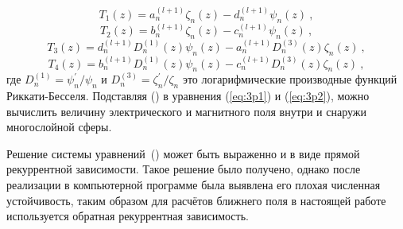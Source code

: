 \begin{equation*}
  T_1(z) =   a^{(l+1)}_{n}  \zeta_{n}(z) 
           - d^{(l+1)}_{n}  \psi_{n}(z)\:,
\end{equation*}
\begin{equation*}
  T_2(z) =   b^{(l+1)}_{n}  \zeta_{n}(z) 
           - c^{(l+1)}_{n}  \psi_{n}(z)\:,
\end{equation*}
\begin{equation*}
  T_3(z) =  d^{(l+1)}_{n}  D^{(1)}_{n}(z)  \psi_{n}(z) 
          - a^{(l+1)}_{n}  D^{(3)}_{n}(z)  \zeta_{n} (z)\:,
\end{equation*}
\begin{equation*}
  T_4(z) =  b^{(l+1)}_{n}  D^{(1)}_{n}(z)  \psi_{n}(z) 
          - c^{(l+1)}_{n}  D^{(3)}_{n}(z)  \zeta_{n} (z)\:,
\end{equation*}
где  $D^{(1)}_{n} = \psi^{\prime}_{n}/\psi_{n}$ и
$D^{(3)}_{n} = \zeta^{\prime}_{n}/\zeta_{n}$ это логарифмические
производные функций Риккати-Бесселя. Подставляя
() в уравнения (\ref{eq:3p1}) и
(\ref{eq:3p2}), можно вычислить величину электрического и магнитного
поля внутри и снаружи многослойной сферы.

Решение системы
уравнений~() может быть
выраженно и в виде прямой рекуррентной зависимости. Такое решение было
получено, однако после реализации в компьютерной программе была
выявлена его плохая численная устойчивость, таким образом для расчётов
ближнего поля в настоящей работе используется обратная рекуррентная
зависимость.

